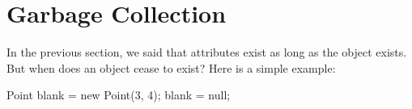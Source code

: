 %
%
%
%
%
%
%
%
%
%


\section{Garbage Collection}

In the previous section, we said that attributes exist as long as the object exists.
But when does an object cease to exist?
Here is a simple example:


\begin{code}
Point blank = new Point(3, 4);
blank = null;
\end{code}

